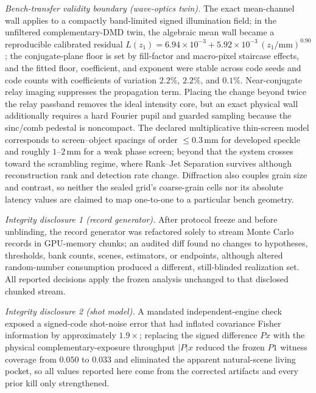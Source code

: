 \documentclass[aps,prl,reprint,groupedaddress,superscriptaddress,floatfix]{revtex4-2}
\begin{document}
\emph{Bench-transfer validity boundary (wave-optics twin).} The exact
mean-channel wall applies to a compactly band-limited signed illumination
field; in the unfiltered complementary-DMD twin, the algebraic mean wall
became a reproducible calibrated residual
$L(z_1)=6.94\times10^{-3}+5.92\times10^{-3}\,(z_1/\mathrm{mm})^{0.90}$; the
conjugate-plane floor is set by fill-factor and macro-pixel staircase
effects, and the fitted floor, coefficient, and exponent were stable across
code seeds and code counts with coefficients of variation $2.2\%$, $2.2\%$,
and $0.1\%$. Near-conjugate relay imaging suppresses the propagation term.
Placing the change beyond twice the relay passband removes the ideal
intensity core, but an exact physical wall additionally requires a hard
Fourier pupil and guarded sampling because the sinc/comb pedestal is
noncompact. The declared multiplicative thin-screen
model corresponds to screen--object spacings of order $\le 0.3\,\mathrm{mm}$
for developed speckle and roughly $1$--$2\,\mathrm{mm}$ for a weak phase
screen; beyond that the system crosses toward the scrambling regime, where
Rank--Jet Separation survives although reconstruction rank and detection rate
change. Diffraction also couples grain size and contrast, so neither the
sealed grid's coarse-grain cells nor its absolute latency values are claimed
to map one-to-one to a particular bench geometry.

\emph{Integrity disclosure 1 (record generator).} After protocol freeze and
before unblinding, the record generator was refactored solely to stream Monte
Carlo records in GPU-memory chunks; an audited diff found no changes to
hypotheses, thresholds, bank counts, scenes, estimators, or endpoints, although
altered random-number consumption produced a different, still-blinded realization
set. All reported decisions apply the frozen analysis unchanged to that disclosed
chunked stream.

\emph{Integrity disclosure 2 (shot model).} A mandated independent-engine check
exposed a signed-code shot-noise error that had inflated covariance Fisher
information by approximately $1.9\times$; replacing the signed difference $Px$
with the physical complementary-exposure throughput $|P|x$ reduced the frozen
$P1$ witness coverage from $0.050$ to $0.033$ and eliminated the apparent
natural-scene living pocket, so all values reported here come from the corrected
artifacts and every prior kill only strengthened.
\end{document}
